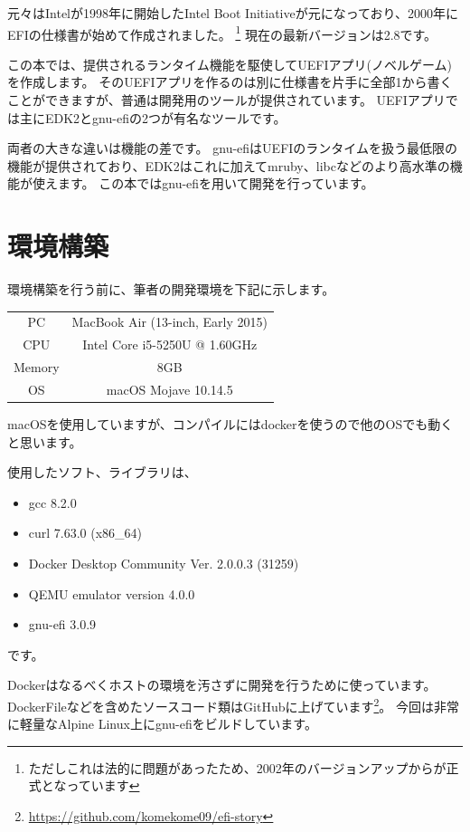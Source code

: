 \documentclass[10pt, b5paper, openany]{ltjsbook}
\begin{document}
元々はIntelが1998年に開始したIntel Boot Initiativeが元になっており、2000年にEFIの仕様書が始めて作成されました。
\footnote{ただしこれは法的に問題があったため、2002年のバージョンアップからが正式となっています}
現在の最新バージョンは2.8です。

この本では、提供されるランタイム機能を駆使してUEFIアプリ(ノベルゲーム)を作成します。
そのUEFIアプリを作るのは別に仕様書を片手に全部1から書くことができますが、普通は開発用のツールが提供されています。
UEFIアプリでは主にEDK2とgnu-efiの2つが有名なツールです。

両者の大きな違いは機能の差です。
gnu-efiはUEFIのランタイムを扱う最低限の機能が提供されており、EDK2はこれに加えてmruby、libcなどのより高水準の機能が使えます。
この本ではgnu-efiを用いて開発を行っています。

\chapter{環境構築}
環境構築を行う前に、筆者の開発環境を下記に示します。
\begin{table}[H]
    \centering
    \begin{tabular}{|c|c|}
        \hline
        PC & MacBook Air (13-inch, Early 2015) \\
        CPU & Intel Core i5-5250U @ 1.60GHz \\
        Memory & 8GB \\
        OS & macOS Mojave 10.14.5 \\
        \hline
    \end{tabular}
\end{table}
macOSを使用していますが、コンパイルにはdockerを使うので他のOSでも動くと思います。

使用したソフト、ライブラリは、
\begin{itemize}
    \item gcc 8.2.0
    \item curl 7.63.0 (x86\_64)
    \item Docker Desktop Community Ver. 2.0.0.3 (31259)
    \item QEMU emulator version 4.0.0
    \item gnu-efi 3.0.9
\end{itemize}
です。

Dockerはなるべくホストの環境を汚さずに開発を行うために使っています。
DockerFileなどを含めたソースコード類はGitHubに上げています\footnote{\url{https://github.com/komekome09/efi-story}}。
今回は非常に軽量なAlpine Linux上にgnu-efiをビルドしています。
\end{document}
